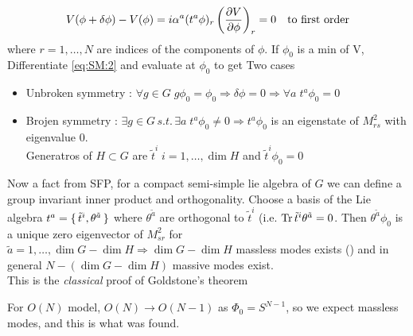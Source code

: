 \documentclass{article}
\begin{document}
\begin{align}\label{eq:SM:2}
V(\phi+\delta\phi) - V(\phi) = i\alpha^a (t^a \phi)_r \left(\pd[V]{\phi}\right)_r = 0 \quad \text{to first order}
\end{align}
where $r=1,\dots,N$ are indices of the components of $\phi$. If $\phi_0$ is a min of V, 
Differentiate \ref{eq:SM:2} and evaluate at $\phi_0$ to get 
Two cases 
\begin{itemize}
    \item Unbroken symmetry : $\forall g \in G \; g\phi_0=\phi_0 \Rightarrow \delta\phi=0 \Rightarrow \forall a \; t^a \phi_0 = 0$
    \item Brojen symmetry : $\exists g\in G \, s.t. \, \exists a \; t^a \phi_0 \neq 0 \Rightarrow t^a \phi_0$ is an eigenstate of $M^2_{rs}$ with eigenvalue 0.  \\
    Generatros of $H\subset G$ are $\tilde{t}^i \; i=1,\dots,\dim H$ and $\tilde{t}^i \phi_0 = 0$
\end{itemize}

Now a fact from SFP, for a compact semi-simple lie algebra of $G$ we can define a group invariant inner product and orthogonality. Choose a basis of the Lie algebra $t^a = \set{\tilde{t}^i, \theta^{\tilde{a}} }$ where $\theta^{\tilde{a}}$ are orthogonal to $\tilde{t}^i$ (i.e. $\tr {\tilde{t}}^i \theta^{\tilde{a}} = 0$. Then $\theta^{\tilde{a}} \phi_0$ is a unique zero eigenvector of $M^2_{sr}$ for $\tilde{a}=1,\dots,\dim G - \dim H \Rightarrow \dim G - \dim H$ massless modes  exists () and in general $N-(\dim G - \dim H)$ massive modes exist. \\
This is the \emph{classical} proof of Goldstone's theorem

\begin{example}
For $O(N)$ model, $O(N) \to O(N-1)$ as $\Phi_0 = S^{N-1}$, so we expect
massless modes, and  this is what was found. 
\end{example}
\end{document}
